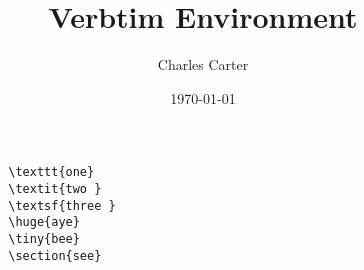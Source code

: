 \documentclass{article}
\title{Verbtim Environment}
\author{Charles Carter}
\date{\today{}}
\begin{document}
 
    \maketitle{}
    \begin{verbatim}
        \texttt{one}
        \textit{two }
        \textsf{three }
        \huge{aye}
        \tiny{bee}
        \section{see}
    \end{verbatim}
\end{document}
